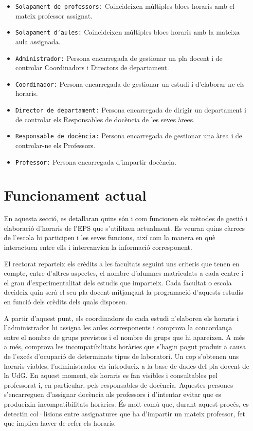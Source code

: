 \documentclass[a4paper,12pt]{ThesisStyle}
\begin{document}
\begin{itemize}
  \item \texttt{Solapament de professors:} Coincideixen múltiples blocs horaris amb el mateix professor assignat.
  \item \texttt{Solapament d'aules:} Coincideixen múltiples blocs horaris amb la mateixa aula assignada.
  \item \texttt{Administrador:} Persona encarregada de gestionar un pla docent i de controlar Coordinadors i Directors de departament.
  \item \texttt{Coordinador:} Persona encarregada de gestionar un estudi i d'elaborar-ne els horaris.
  \item \texttt{Director de departament:} Persona encarregada de dirigir un departament i de controlar els Responsables de docència de les seves àrees.
  \item \texttt{Responsable de docència:} Persona encarregada de gestionar una àrea i de controlar-ne els Professors.
  \item \texttt{Professor:} Persona encarregada d'impartir docència.
\end{itemize}

\section{Funcionament actual}
\label{sec:funcionament_actual}

En aquesta secció, es detallaran quins són i com funcionen els mètodes de gestió i elaboració d'horaris de l'EPS que s'utilitzen actualment. Es veuran quins càrrecs de l'escola hi participen i les seves funcions, així com la manera en què interactuen entre ells i intercanvien la informació corresponent.

El rectorat reparteix els crèdits a les facultats seguint uns criteris que tenen en compte, entre d'altres aspectes, el nombre d'alumnes matriculats a cada centre i el grau d'experimentalitat dels estudis que imparteix. Cada facultat o escola decideix quin serà el seu pla docent mitjançant la programació d'aquests estudis en funció dels crèdits dels quals disposen.

A partir d'aquest punt, els coordinadors de cada estudi n'elaboren els horaris i l'administrador hi assigna les aules corresponents i comprova la concordança entre el nombre de grups previstos i el nombre de grups que hi apareixen. A més a més, comprova les incompatibilitats horàries que s'hagin pogut produir a causa de l'excés d'ocupació de determinats tipus de laboratori. Un cop s'obtenen uns horaris viables, l'administrador els introdueix a la base de dades del pla docent de la UdG. En aquest moment, els horaris es fan visibles i consultables pel professorat i, en particular, pels responsables de docència. Aquestes persones s'encarreguen d'assignar docència als professors i d'intentar evitar que es produeixin incompatibilitats horàries. És molt comú que, durant aquest procés, es detectin col·lisions entre assignatures que ha d'impartir un mateix professor, fet que implica haver de refer els horaris.
\end{document}
